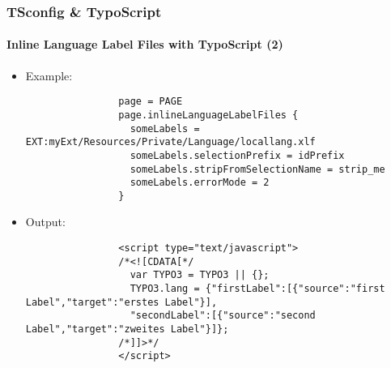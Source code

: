 \begin{frame}[fragile]
	\frametitle{TSconfig \& TypoScript}
	\framesubtitle{Inline Language Label Files with TypoScript (2)}

	\lstset{basicstyle=\tiny\ttfamily}

	\begin{itemize}

		\item Example:

			\begin{lstlisting}
				page = PAGE
				page.inlineLanguageLabelFiles {
				  someLabels = EXT:myExt/Resources/Private/Language/locallang.xlf
				  someLabels.selectionPrefix = idPrefix
				  someLabels.stripFromSelectionName = strip_me
				  someLabels.errorMode = 2
				}
			\end{lstlisting}

		\item Output:

			\begin{lstlisting}
				<script type="text/javascript">
				/*<![CDATA[*/
				  var TYPO3 = TYPO3 || {};
				  TYPO3.lang = {"firstLabel":[{"source":"first Label","target":"erstes Label"}],
				  "secondLabel":[{"source":"second Label","target":"zweites Label"}]};
				/*]]>*/
				</script>
			\end{lstlisting}

	\end{itemize}

\end{frame}

